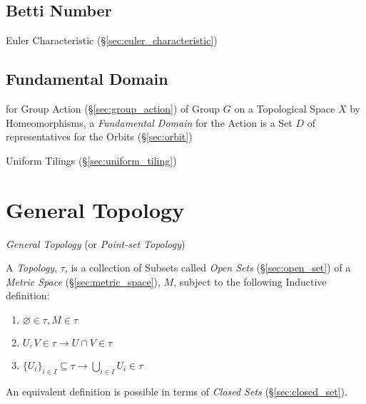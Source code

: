 \subsection{Betti Number}\label{sec:betti_number}

Euler Characteristic (\S\ref{sec:euler_characteristic})



\subsection{Fundamental Domain}\label{sec:fundamental_domain}

for Group Action (\S\ref{sec:group_action}) of Group $G$ on a Topological Space
$X$ by Homeomorphisms, a \emph{Fundamental Domain} for the Action is a Set $D$
of representatives for the Orbits (\S\ref{sec:orbit})

Uniform Tilings (\S\ref{sec:uniform_tiling})



\section{General Topology}\label{sec:general_topology}

\emph{General Topology} (or \emph{Point-set Topology})

A \emph{Topology}, $\tau$, is a collection of Subsets called
\emph{Open Sets} (\S\ref{sec:open_set}) of a \emph{Metric Space}
(\S\ref{sec:metric_space}), $M$, subject to the following Inductive
definition:
\begin{enumerate}
\item $\varnothing \in \tau, M \in \tau$
\item $U,V \in \tau \rightarrow U \cap V \in \tau$
\item $\{U_i\}_{i \in I} \subseteq \tau \rightarrow \bigcup_{i \in I}
  U_i \in \tau$
\end{enumerate}

An equivalent definition is possible in terms of \emph{Closed Sets}
(\S\ref{sec:closed_set}).



